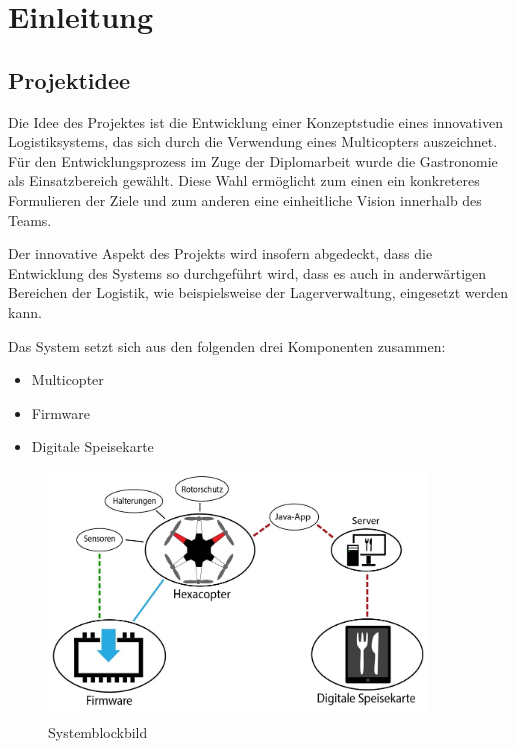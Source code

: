 \chapter{Einleitung}
\renewcommand{\kapitelautor}{Autor: Markus Kaiser}

\section{Projektidee}
Die Idee des Projektes ist die Entwicklung einer Konzeptstudie eines innovativen Logistiksystems, das sich durch die Verwendung eines Multicopters auszeichnet.
Für den Entwicklungsprozess im Zuge der Diplomarbeit wurde die Gastronomie als Einsatzbereich gewählt. Diese Wahl ermöglicht zum einen
ein konkreteres Formulieren der Ziele und zum anderen eine einheitliche Vision innerhalb des Teams.

Der innovative Aspekt des Projekts wird insofern abgedeckt, dass die Entwicklung des Systems so durchgeführt wird,
dass es auch in anderwärtigen Bereichen der Logistik, wie beispielsweise der Lagerverwaltung, eingesetzt werden kann.

Das System setzt sich aus den folgenden drei Komponenten zusammen:

\begin{itemize}
  \item Multicopter
  \item Firmware
  \item Digitale Speisekarte
\end{itemize}

\begin{figure}[H]
  \begin{centering}
  \includegraphics[width = 0.9\textwidth]{Bilder/systemblockbild.jpg}
  \par\end{centering}
  \caption{Systemblockbild}
  \label{Systemblockbild}
\end{figure}

